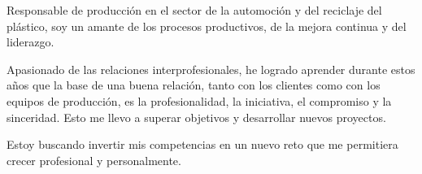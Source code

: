 
\begin{cvparagraph}
    Responsable de producción en el sector de la automoción y del reciclaje del plástico, soy un amante de los procesos productivos, de la mejora continua y del liderazgo.
\end{cvparagraph}

\begin{cvparagraph}
    Apasionado de las relaciones interprofesionales, he logrado aprender durante estos años que la base de una buena relación, tanto con los clientes como con los equipos de producción, es la profesionalidad, la iniciativa, el compromiso y la sinceridad.
    Esto me llevo a superar objetivos y desarrollar nuevos proyectos.
\end{cvparagraph}

\begin{cvparagraph}
    Estoy buscando invertir mis competencias en un nuevo reto que me permitiera crecer profesional y personalmente.
\end{cvparagraph}